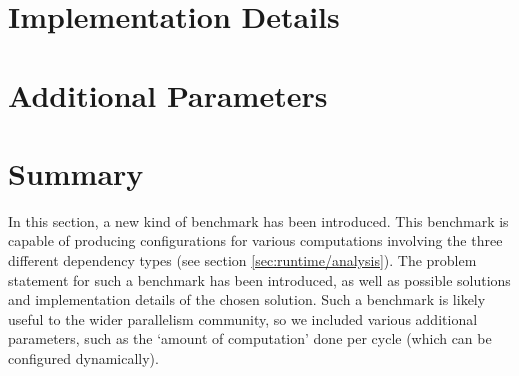 \section{Implementation Details} \label{sec:parametric/implementation}

\section{Additional Parameters} \label{sec:parametric/additional-params}

\section{Summary} \label{sec:parametric/summary}
In this section, a new kind of benchmark has been introduced. This benchmark is capable of producing configurations for various computations involving the three different dependency types (see section \ref{sec:runtime/analysis}). The problem statement for such a benchmark has been introduced, as well as possible solutions and implementation details of the chosen solution. Such a benchmark is likely useful to the wider parallelism community, so we included various additional parameters, such as the `amount of computation' done per cycle (which can be configured dynamically).